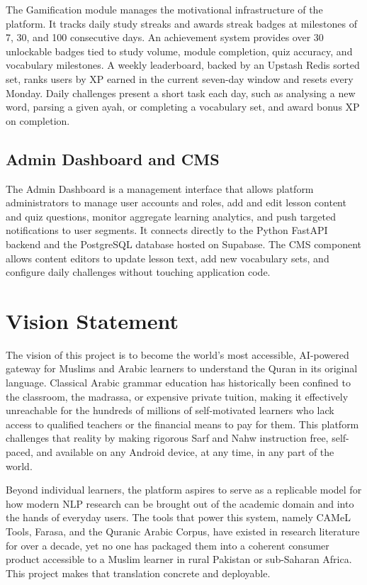 \documentclass[A4paper,12pt]{article}
\begin{document}
The Gamification module manages the motivational infrastructure of the platform. It tracks
daily study streaks and awards streak badges at milestones of 7, 30, and 100 consecutive days.
An achievement system provides over 30 unlockable badges tied to study volume, module
completion, quiz accuracy, and vocabulary milestones. A weekly leaderboard, backed by an
Upstash Redis sorted set, ranks users by XP earned in the current seven-day window and resets
every Monday. Daily challenges present a short task each day, such as analysing a new word,
parsing a given ayah, or completing a vocabulary set, and award bonus XP on completion.

\subsection{Admin Dashboard and CMS}

The Admin Dashboard is a management interface that allows platform administrators to manage
user accounts and roles, add and edit lesson content and quiz questions, monitor aggregate
learning analytics, and push targeted notifications to user segments. It connects directly to
the Python FastAPI backend and the PostgreSQL database hosted on Supabase. The CMS component
allows content editors to update lesson text, add new vocabulary sets, and configure daily
challenges without touching application code.

\section{Vision Statement}

The vision of this project is to become the world's most accessible, AI-powered gateway for
Muslims and Arabic learners to understand the Quran in its original language. Classical Arabic
grammar education has historically been confined to the classroom, the madrassa, or expensive
private tuition, making it effectively unreachable for the hundreds of millions of self-motivated
learners who lack access to qualified teachers or the financial means to pay for them. This
platform challenges that reality by making rigorous Sarf and Nahw instruction free, self-paced,
and available on any Android device, at any time, in any part of the world.

Beyond individual learners, the platform aspires to serve as a replicable model for how modern
NLP research can be brought out of the academic domain and into the hands of everyday users. The
tools that power this system, namely CAMeL Tools, Farasa, and the Quranic Arabic Corpus, have
existed in research literature for over a decade, yet no one has packaged them into a coherent
consumer product accessible to a Muslim learner in rural Pakistan or sub-Saharan Africa. This
project makes that translation concrete and deployable.
\end{document}
